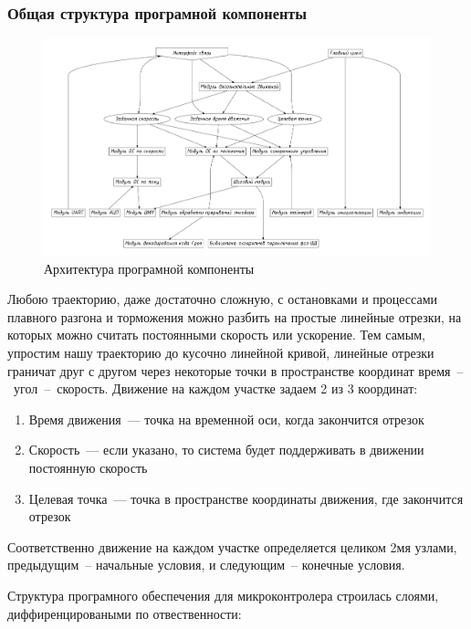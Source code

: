 \subsubsection{Общая структура програмной компоненты}
\begin{figure}[ht!]
    \centering
    \includegraphics[width=1.3\linewidth,
                     angle=90,
                     trim=0mm 100mm 0mm 100mm]
                    {src/pictures/soft_arch.pdf}
    \caption{Архитектура програмной компоненты}
    \label{control_object_general_view}
\end{figure}
Любою траекторию, даже достаточно сложную, с остановками и процессами плавного
разгона и торможения можно разбить на простые линейные отрезки, на которых можно
считать постоянными скорость или ускорение. Тем самым, упростим нашу траекторию
до кусочно линейной кривой, линейные отрезки граничат друг с другом через
некоторые точки в пространстве координат время~--~угол~--~скорость.
Движение на каждом участке задаем 2 из 3 координат:

\begin{enumerate}
    \item Время движения~--- точка на временной оси, когда закончится отрезок
    \item Скорость~--- если указано, то система будет поддерживать в движении
        постоянную скорость
    \item Целевая точка~--- точка в пространстве координаты движения, где
        закончится отрезок
\end{enumerate}
Соответственно движение на каждом участке определяется целиком 2мя узлами,
предыдущим~-- начальные условия, и следующим~-- конечные условия.

Структура програмного обеспечения для микроконтролера строилась слоями,
диффиренцироваными по отвественности:

